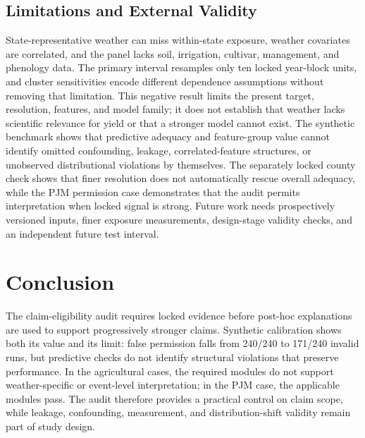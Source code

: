 \documentclass[conference]{IEEEtran}
\begin{document}
\subsection{Limitations and External Validity}
State-representative weather can miss within-state exposure, weather covariates
are correlated, and the panel lacks soil, irrigation, cultivar, management, and
phenology data. The primary interval resamples only ten locked year-block units, and
cluster sensitivities encode different dependence assumptions without removing
that limitation. This negative result limits the present target, resolution,
features, and model family; it does not establish that weather lacks scientific
relevance for yield or that a stronger model cannot exist. The synthetic
benchmark shows that predictive adequacy and feature-group value cannot identify
omitted confounding, leakage, correlated-feature structures, or unobserved
distributional violations by themselves. The separately locked county check shows
that finer resolution does not automatically rescue overall adequacy, while the
PJM permission case demonstrates that the audit permits interpretation when
locked signal is strong.
Future work needs prospectively versioned inputs, finer exposure measurements,
design-stage validity checks, and an independent future test interval.

\section{Conclusion}
The claim-eligibility audit requires locked evidence before post-hoc explanations
are used to support progressively stronger claims. Synthetic calibration shows
both its value and its limit: false permission falls from 240/240 to 171/240
invalid runs, but predictive checks do not identify structural violations that
preserve performance. In the agricultural cases, the required modules do not
support weather-specific or event-level interpretation; in the PJM case, the
applicable modules pass. The audit therefore provides a practical control on
claim scope, while leakage, confounding, measurement, and distribution-shift
validity remain part of study design.



\end{document}
